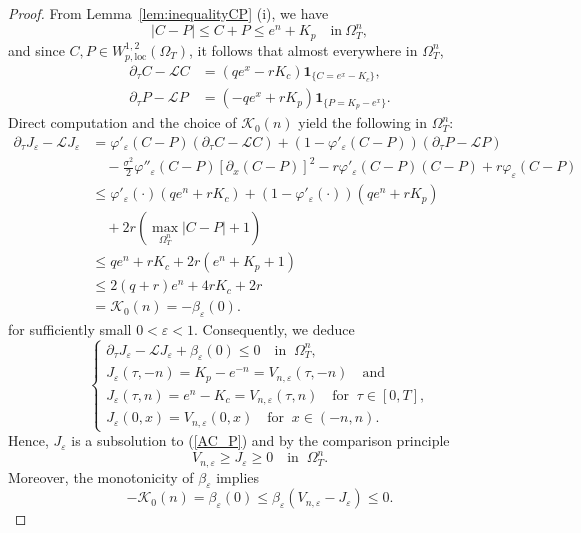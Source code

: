 \documentclass[11pt, a4paper, leqno]{amsart}
\numberwithin{equation}{section}
\theoremstyle{plain}
\theoremstyle{definition}
\theoremstyle{remark}
\def\leq{\leqslant}
\def\geq{\geqslant}
\begin{document}
\begin{proof}

From Lemma~\ref{lem:inequalityCP} (i), we have
\[
\vert C-P\vert\leq C+P\leq { e^n+K_p
}
\quad\text{in}\ \Omega_T^n,
\]
and since $C,P\in W^{1,2}_{p,\text{loc}}(\Omega_T)$,
it follows that almost everywhere in $\Omega_T^n$,
\begin{align*}
    \partial_\tau C-\mathcal{L}C
    &=(qe^x-rK_c)\mathbf{1}_{\{C=e^x-K_c\}},
    \\
    \partial_\tau P-\mathcal{L}P
    &=(-qe^x+rK_p)\mathbf{1}_{\{P=K_p-e^x\}}.
\end{align*}
Direct computation and the choice of $\mathcal{K}_0{(n)}$ yield the following
in $\Omega_T^n$:
\begin{align*}
\partial_\tau J_\varepsilon - \mathcal{L} J_\varepsilon
&= \varphi'_\varepsilon(C-P)
   \left( \partial_\tau C - \mathcal{L}C \right)
 + \left( 1 - \varphi'_\varepsilon(C-P) \right)
   \left( \partial_\tau P - \mathcal{L}P \right) \\
&\quad - \frac{\sigma^2}{2}
\varphi''_\varepsilon(C-P)
\left[ \partial_x(C-P) \right]^2 
 - r\varphi'_\varepsilon(C-P)(C-P)
 + r\varphi_\varepsilon(C-P) \\
&\leq {
\varphi'_\varepsilon(\cdot)(qe^n+rK_c)
+\left(1-\varphi'_\varepsilon(\cdot)\right)(qe^n+rK_p)
} \\
&\quad +2r\left(\max_{\Omega_T^n}|C-P|+1\right) \\
&\leq {
qe^n+rK_c+2r(e^n+K_p+1)
} \\
&\leq {
2(q+r)e^n+4rK_c+2r
} \\
&={\mathcal{K}_0{(n)}}
=-\beta_\varepsilon(0).
\end{align*}
for sufficiently small $0<\varepsilon<1$.
Consequently, we deduce
\begin{equation*}
     \begin{cases}
    \partial_{\tau}J_{\varepsilon}-\mathcal{L} J_{\varepsilon}
    +\beta_\varepsilon(0)\leq0
    \quad \text{in }\  \Omega^{n}_T,
    \\
    {
    J_{\varepsilon}(\tau,-n)=K_p-e^{-n}
    =V_{n,\varepsilon}(\tau,-n)
    \quad\text{and}
    }
    \\
    {
    J_{\varepsilon}(\tau,n)=e^n-K_c
    =V_{n,\varepsilon}(\tau,n)
    \quad \text{for }\ \tau\in [0,T],
    }
    \\
    J_{\varepsilon}(0,x)=V_{n,\varepsilon}(0,x)
    \quad \text{for }\ x\in (-n,n).
    \end{cases}
\end{equation*}
Hence, $J_{\varepsilon}$ is a subsolution to (\ref{AC_P}) 
and by the comparison principle \cite[Theorem 1.1]{YY08}
\begin{equation*}
V_{n,\varepsilon}\geq J_{\varepsilon} \geq 0
\quad \text{in }\  \Omega_T^n.    
\end{equation*}
Moreover, the monotonicity of $\beta_\varepsilon$ implies
\[
-\mathcal{K}_0{(n)}=\beta_{\varepsilon}(0)
\leq \beta_\varepsilon(V_{n,\varepsilon}-J_{\varepsilon})
\leq 0.
\]


\end{proof}
\end{document}
